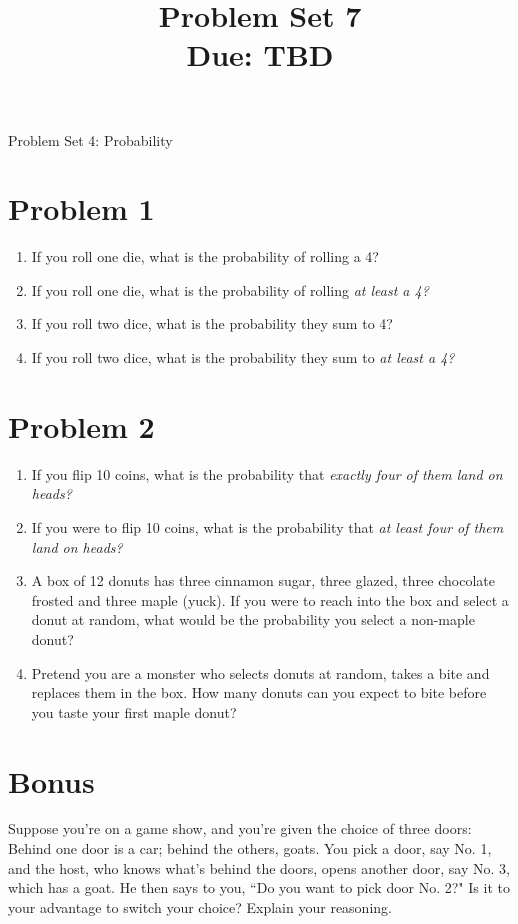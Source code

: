 \documentclass[11pt]{article}
\title{Problem Set 7\\ Due: TBD}%
\theoremstyle{definition}
\theoremstyle{remark}
\begin{document}
\begin{center}
{\huge Problem Set 4: Probability}\\[5pt]
\end{center}

\section*{Problem 1}
\begin{enumerate}
\item If you roll one die, what is the probability of rolling a 4?
\item If you roll one die, what is the probability of rolling \em at least \em a 4?
\item If you roll two dice, what is the probability they sum to 4?
\item If you roll two dice, what is the probability they sum to \em at least \em a 4?
\end{enumerate}

\section*{Problem 2}
\begin{enumerate}
\item If you flip 10 coins, what is the probability that \em exactly \em four of them land on heads?
\item If you were to flip 10 coins, what is the probability that \em at least \em four of them land on heads?
\item A box of 12 donuts has three cinnamon sugar, three glazed, three chocolate frosted and three maple (yuck).  If you were to reach into the box and select a donut at random, what would be the probability you select a non-maple donut?
\item Pretend you are a monster who selects donuts at random, takes a bite and replaces them in the box.  How many donuts can you expect to bite before you taste your first maple donut?

\end{enumerate}

\section*{Bonus}
Suppose you're on a game show, and you're given the choice of three doors: Behind one door is a car; behind the others, goats. You pick a door, say No. 1, and the host, who knows what's behind the doors, opens another door, say No. 3, which has a goat. He then says to you, ``Do you want to pick door No. 2?" Is it to your advantage to switch your choice?  Explain your reasoning.
\end{document}

